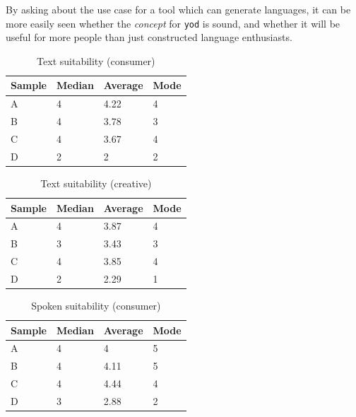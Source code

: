 \documentclass{report}
\begin{document}
	By asking about the use case for a tool which can generate languages, it can be more easily seen whether the \textit{concept} for \texttt{yod} is sound, and whether it will be useful for more people than just constructed language enthusiasts.
	
	\begin{table}[h]
		\caption{Text suitability (consumer)}
		\label{suitability text consumer}
		\centering
		\begin{tabular}{|l|l|l|l|}
			\hline
			\rowcolor[HTML]{D8D8D8}Sample & Median & Average & Mode \\ \hline
			A      & 4      & 4.22    & 4    \\
			B      & 4      & 3.78    & 3    \\
			C      & 4      & 3.67    & 4    \\
			D      & 2      & 2       & 2    \\ \hline
		\end{tabular}
	\end{table}
	\quad
	\begin{table}[h]
		\caption{Text suitability (creative)}
		\label{suitability text creative}
		\centering
		\begin{tabular}{|l|l|l|l|}
			\hline
			\rowcolor[HTML]{D8D8D8}Sample & Median & Average & Mode \\ \hline
			A      & 4      & 3.87    & 4    \\
			B      & 3      & 3.43    & 3    \\
			C      & 4      & 3.85    & 4    \\
			D      & 2      & 2.29    & 1    \\ \hline
		\end{tabular}
	\end{table}

	\begin{table}[h]
		\caption{Spoken suitability (consumer)}
		\label{suitability spoken consumer}
		\centering
		\begin{tabular}{|l|l|l|l|}
			\hline
			\rowcolor[HTML]{D8D8D8}Sample & Median & Average & Mode \\ \hline
			A      & 4      & 4		  & 5    \\
			B      & 4      & 4.11    & 5    \\
			C      & 4      & 4.44    & 4    \\
			D      & 3      & 2.88    & 2    \\ \hline
		\end{tabular}
	\end{table}
\end{document}
